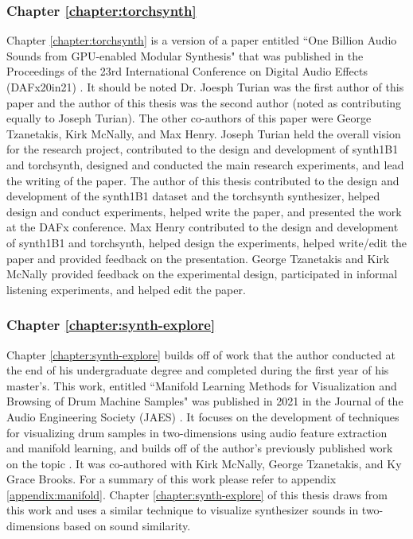 \subsubsection{Chapter \ref{chapter:torchsynth}}
Chapter \ref{chapter:torchsynth} is a version of a paper entitled ``One Billion Audio Sounds from GPU-enabled Modular Synthesis" that was published in the Proceedings of the 23rd International Conference on Digital Audio Effects (DAFx20in21) \cite{turian2021one}. It should be noted Dr. Joesph Turian was the first author of this paper and the author of this thesis was the second author (noted as contributing equally to Joseph Turian). The other co-authors of this paper were George Tzanetakis, Kirk McNally, and Max Henry. Joseph Turian held the overall vision for the research project, contributed to the design and development of synth1B1 and torchsynth, designed and conducted the main research experiments, and lead the writing of the paper. The author of this thesis contributed to the design and development of the synth1B1 dataset and the torchsynth synthesizer, helped design and conduct experiments, helped write the paper, and presented the work at the DAFx conference. Max Henry contributed to the design and development of synth1B1 and torchsynth, helped design the experiments, helped write/edit the paper and provided feedback on the presentation. George Tzanetakis and Kirk McNally provided feedback on the experimental design, participated in informal listening experiments, and helped edit the paper.

\subsubsection{Chapter \ref{chapter:synth-explore}}
Chapter \ref{chapter:synth-explore} builds off of work that the author conducted at the end of his undergraduate degree and completed during the first year of his master's. This work, entitled ``Manifold Learning Methods for Visualization and Browsing of Drum Machine Samples" was published in 2021 in the Journal of the Audio Engineering Society (JAES) \cite{shier2021manifold}. It focuses on the development of techniques for visualizing drum samples in two-dimensions using audio feature extraction and manifold learning, and builds off of the author's previously published work on the topic \cite{shier2017analysis, shier2017sieve}. It was co-authored with Kirk McNally, George Tzanetakis, and Ky Grace Brooks. For a summary of this work please refer to appendix \ref{appendix:manifold}. Chapter \ref{chapter:synth-explore} of this thesis draws from this work and uses a similar technique to visualize synthesizer sounds in two-dimensions based on sound similarity.

